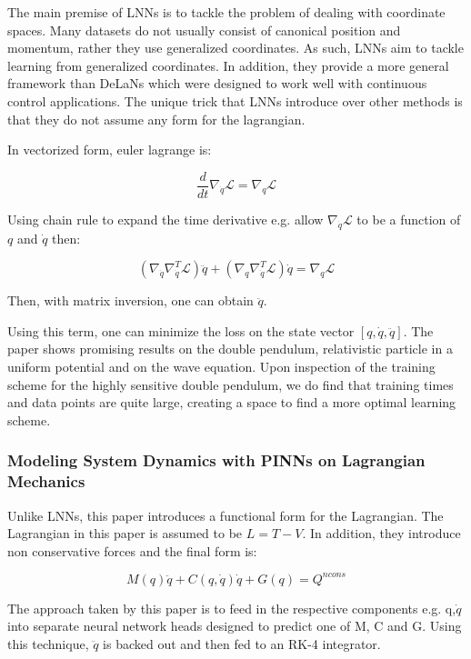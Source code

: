 \documentclass{article}
\begin{document}
The main premise of LNNs \cite{cranmer_lagrangian_2020} is to tackle the problem of dealing with coordinate spaces. Many datasets do not usually consist of  canonical position and momentum, rather they use generalized coordinates. As such, LNNs aim to tackle learning from generalized coordinates. In addition, they provide a more general framework than DeLaNs which were designed to work well with continuous control applications. The unique trick that LNNs introduce over other methods is that they do not assume any form for the lagrangian. 

In vectorized form, euler lagrange is:

\begin{equation}
\frac{d}{dt} \nabla_{\dot{q}} \mathcal{L} = \nabla_q \mathcal{L}
\label{eqn.lnn1}
\end{equation}

Using chain rule to expand the time derivative e.g. allow $\nabla_{\dot{q}}\mathcal{L}$ to be a function of $q$ and $\dot{q}$ then:

\begin{equation}
(\nabla_{\dot{q}}\nabla_{\dot{q}}^T \mathcal{L}) \ddot{q} + (\nabla_q \nabla_{\dot{q}}^T \mathcal{L})\dot{q} = \nabla_q \mathcal{L}
\end{equation}

Then, with matrix inversion, one can obtain $\ddot{q}$. 

Using this term, one can minimize the loss on the state vector $[q,\dot{q},\ddot{q}]$. The paper shows promising results on the double pendulum, relativistic particle in a uniform potential and on the wave equation. Upon inspection of the training scheme for the highly sensitive double pendulum, we do find that training times and data points are quite large, creating a space to find a more optimal learning scheme.

\subsubsection{Modeling System Dynamics with PINNs on Lagrangian Mechanics}

Unlike LNNs, this paper introduces a functional form for the Lagrangian. The Lagrangian in this paper \cite{roehrl_modeling_2020} is assumed to be $L = T -V$. In addition, they introduce non conservative forces and the final form is:

$$ M(q) \ddot{q} + C(q,\dot{q})\dot{q} + G(q) = Q^{ncons} $$

The approach taken by this paper is to feed in the respective components e.g. q,$\dot{q}$ into separate neural network heads designed to predict one of M, C and G. Using this technique, $\ddot{q}$ is backed out and then fed to an RK-4 integrator.
\end{document}
